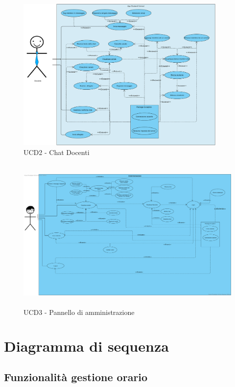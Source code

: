 \begin{figure}
	\centering
	\includegraphics[height=3in]{imgs/gruppo6/use_case_diagrams/ucd2_chat_docenti.pdf}
	\caption{UCD2 - Chat Docenti}
	\label{fig:ucd2-doc}
\end{figure}

\begin{figure}
	\centering
	\includegraphics[height=3in]{imgs/gruppo6/use_case_diagrams/ucd3_pannello.pdf}
	\caption{UCD3 - Pannello di amministrazione}
	\label{fig:ucd3-amm}
\end{figure}


\newpage
\section{Diagramma di sequenza}

\subsection{Funzionalità gestione orario}

